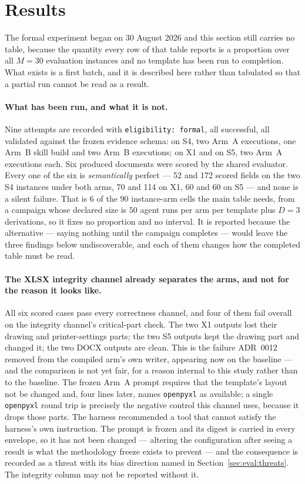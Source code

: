 \section{Results}
\label{sec:eval:results}

The formal experiment began on 30 August 2026 and this section still carries no table, because
the quantity every row of that table reports is a proportion over all $M=30$ evaluation
instances and no template has been run to completion. What exists is a first batch, and it is
described here rather than tabulated so that a partial run cannot be read as a result.

\paragraph{What has been run, and what it is not.}
Nine attempts are recorded with \texttt{eligibility: formal}, all successful, all validated
against the frozen evidence schema: on S4, two Arm~A executions, one Arm~B skill build and two
Arm~B executions; on X1 and on S5, two Arm~A executions each. Six produced documents were
scored by the shared evaluator. Every one of the six is \emph{semantically} perfect --- 52 and
172 scored fields on the two S4 instances under both arms, 70 and 114 on X1, 60 and 60 on S5 ---
and none is a silent failure. That is $6$ of the $90$ instance-arm cells the main table needs,
from a campaign whose declared size is $50$ agent runs per arm per template plus $D=3$
derivations, so it fixes no proportion and no interval. It is reported because the alternative
--- saying nothing until the campaign completes --- would leave the three findings below
undiscoverable, and each of them changes how the completed table must be read.

\paragraph{The XLSX integrity channel already separates the arms, and not for the reason it
looks like.}
All six scored cases pass every correctness channel, and four of them fail overall on the
integrity channel's critical-part check. The two X1 outputs lost their drawing and
printer-settings parts; the two S5 outputs kept the drawing part and changed it; the two
DOCX outputs are clean. This is the failure ADR~0012 removed from the compiled arm's own
writer, appearing now on the baseline --- and the comparison is not yet
fair, for a reason internal to this study rather than to the baseline. The frozen Arm~A prompt
requires that the template's layout not be changed and, four lines later, names
\texttt{openpyxl} as available; a single \texttt{openpyxl} round trip is precisely the
negative control this channel uses, because it drops those parts. The harness recommended a
tool that cannot satisfy the harness's own instruction. The prompt is frozen and its digest is
carried in every envelope, so it has not been changed --- altering the configuration after
seeing a result is what the methodology freeze exists to prevent --- and
the consequence is recorded as a threat with its bias direction named in
Section~\ref{sec:eval:threats}. The integrity column may not be reported without it.

